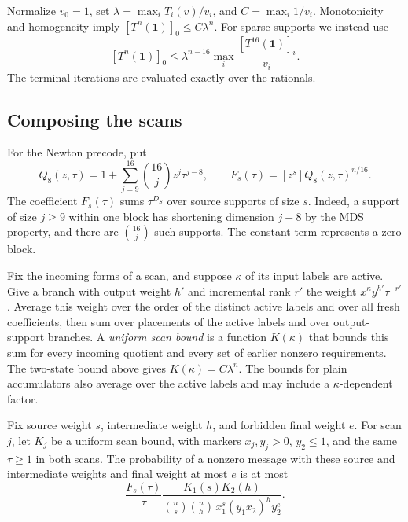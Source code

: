 Normalize $v_0=1$, set $\lambda=\max_i T_i(v)/v_i$, and
$C=\max_i1/v_i$. Monotonicity and homogeneity imply
$[T^n(\mathbf1)]_0\le C\lambda^n$. For sparse supports we instead use
\begin{equation}\label{eq:scan-terminal-sixteen}
 [T^n(\mathbf1)]_0\le
 \lambda^{n-16}\max_i\frac{[T^{16}(\mathbf1)]_i}{v_i}.
\end{equation}
The terminal iterations are evaluated exactly over the rationals.

\subsection{Composing the scans}

For the Newton precode, put
\begin{equation}\label{eq:newton-source-polynomial}
 Q_8(z,\tau)=1+\sum_{j=9}^{16}\binom{16}{j}z^j\tau^{j-8},
 \qquad F_s(\tau)=[z^s]Q_8(z,\tau)^{n/16}.
\end{equation}
The coefficient $F_s(\tau)$ sums $\tau^{D_S}$ over source supports of
size $s$. Indeed, a support of size $j\ge9$ within one block has
shortening dimension $j-8$ by the MDS property, and there are
$\binom{16}{j}$ such supports. The constant term represents a zero block.

Fix the incoming forms of a scan, and suppose $\kappa$ of its input
labels are active. Give a branch with output weight $h'$ and incremental
rank $r'$ the weight $x^\kappa y^{h'}\tau^{-r'}$. Average this weight
over the order of the distinct active labels and over all fresh
coefficients, then sum over placements of the active labels and over
output-support branches. A \emph{uniform scan bound} is a function
$K(\kappa)$ that bounds this sum for every incoming quotient and every
set of earlier nonzero requirements. The two-state bound above gives
$K(\kappa)=C\lambda^n$. The bounds for plain accumulators also average
over the active labels and may include a $\kappa$-dependent factor.

\begin{lemma}\label{lem:scan-composition}
Fix source weight $s$, intermediate weight $h$, and forbidden final
weight $e$. For scan $j$, let $K_j$ be a uniform scan bound, with
markers $x_j,y_j>0$, $y_2\le1$, and the same $\tau\ge1$ in both scans.
The probability of a nonzero message with these source and intermediate
weights and final weight at most $e$ is at most
\begin{equation}\label{eq:general-profile}
 \frac{F_s(\tau)}{\tau}
 \frac{K_1(s)K_2(h)}
 {\binom ns\binom nh\,x_1^s(y_1x_2)^h y_2^e}.
\end{equation}
\end{lemma}

